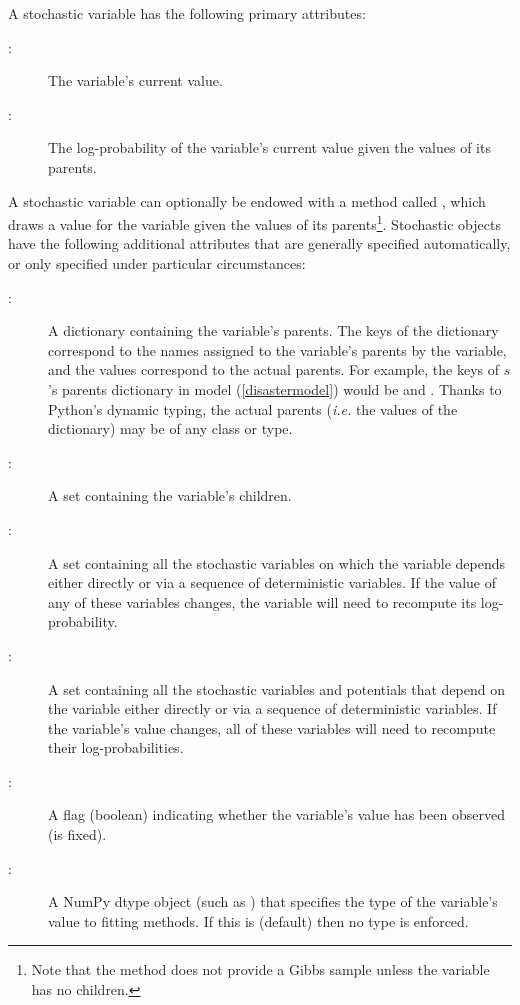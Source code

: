 A stochastic variable has the following primary attributes: 
\begin{description}
    \item[:] The variable's current value.
    \item[:] The log-probability of the variable's current value given the values of its parents.
\end{description}
A stochastic variable can optionally be endowed with a method called , which draws a value for the variable given the values of its parents\footnote{Note that the  method does not provide a Gibbs sample unless the variable has no children.}. Stochastic objects have the following additional attributes that are generally specified automatically, or only specified under particular circumstances:
\begin{description}
    \item[:] A dictionary containing the variable's parents. The keys of the dictionary correspond to the names assigned to the variable's parents by the variable, and the values correspond to the actual parents. For example, the keys of $s$'s parents dictionary in model (\ref{disastermodel}) would be  and . Thanks to Python's dynamic typing, the actual parents (\emph{i.e.} the values of the dictionary) may be of any class or type.
    \item[:] A set containing the variable's children.
    \item[:] A set containing all the stochastic variables on which the variable depends either directly or via a sequence of deterministic variables. If the value of any of these variables changes, the variable will need to recompute its log-probability.
    \item[:] A set containing all the stochastic variables and potentials that depend on the variable either directly or via a sequence of deterministic variables. If the variable's value changes, all of these variables will need to recompute their log-probabilities.
    \item[:] A flag (boolean) indicating whether the variable's value has been observed (is fixed).
    \item[:] A NumPy dtype object (such as ) that specifies the type of the variable's value to fitting methods. If this is  (default) then no type is enforced.
\end{description}

